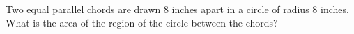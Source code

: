 Two equal parallel chords are drawn $8$ inches apart in a circle of radius $8$ inches. What is the area of the region of the circle between the chords?
